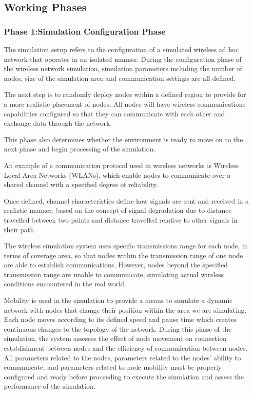 \documentclass[a4paper,fleqn]{cas-dc}
\numberwithin{equation}{section}
\begin{document}
\clearpage
\subsection{Working Phases}

\subsubsection{Phase 1:Simulation Configuration Phase}
The simulation setup refers to the configuration of a simulated wireless ad hoc network that operates in an isolated manner. During the configuration phase of the wireless network simulation, simulation parameters including the number of nodes, size of the simulation area and communication settings are all defined.

The next step is to randomly deploy nodes within a defined region to provide for a more realistic placement of nodes. All nodes will have wireless communications capabilities configured so that they can communicate with each other and exchange data through the network.

This phase also determines whether the environment is ready to move on to the next phase and begin processing of the simulation.

An example of a communication protocol used in wireless networks is Wireless Local Area Networks (WLANs), which enable nodes to communicate over a shared channel with a specified degree of reliability.

Once defined, channel characteristics define how signals are sent and received in a realistic manner, based on the concept of signal degradation due to distance travelled between two points and distance travelled relative to other signals in their path.

The wireless simulation system uses specific transmissions range for each node, in terms of coverage area, so that nodes within the transmission range of one node are able to establish communications. However, nodes beyond the specified transmission range are unable to communicate, simulating actual wireless conditions encountered in the real world.

Mobility is used in the simulation to provide a means to simulate a dynamic network with nodes that change their position within the area we are simulating. Each node moves according to its defined speed and pause time which creates continuous changes to the topology of the network. During this phase of the simulation, the system assesses the effect of node movement on connection establishment between nodes and the efficiency of communication between nodes. All parameters related to the nodes, parameters related to the nodes' ability to communicate, and parameters related to node mobility must be properly configured and ready before proceeding to execute the simulation and assess the performance of the simulation.
\end{document}

